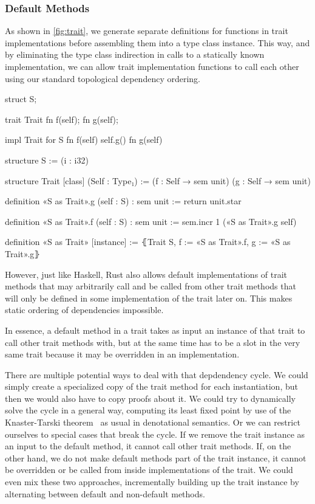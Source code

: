 \subsubsection{Default Methods}
\label{sec:default}

As shown in \autoref{fig:trait}, we generate separate definitions for functions in trait
implementations before assembling them into a type class instance. This way, and
by eliminating the type class indirection in calls to a statically known
implementation, we can allow trait implementation functions to call each other
using our standard topological dependency ordering.

\begin{sbs1}
struct S;

trait Trait {
  fn f(self);
  fn g(self);
}

impl Trait for S {
  fn f(self) {
    self.g()
  }
  fn g(self) {}
}
\end{sbs1}
\begin{sbs2}
structure S := (i : i32)

structure Trait [class] (Self : Type₁) :=
(f : Self → sem unit)
(g : Self → sem unit)

definition «S as Trait».g (self : S) : sem unit :=
return unit.star

definition «S as Trait».f (self : S) : sem unit :=
sem.incr 1 («S as Trait».g self)

definition «S as Trait» [instance] :=
⦃Trait S, f := «S as Trait».f, g := «S as Trait».g⦄
\end{sbs2}

However, just like Haskell, Rust also allows default implementations of trait
methods that may arbitrarily call and be called from other trait methods that
will only be defined in some implementation of the trait later on. This
makes static ordering of dependencies impossible.

In essence, a default method in a trait takes as input an instance of that trait
to call other trait methods with, but at the same time has to be a slot in the
very same trait because it may be overridden in an implementation.

There are multiple potential ways to deal with that depdendency cycle. We could
simply create a specialized copy of the trait method for each instantiation, but
then we would also have to copy proofs about it. We could try to dynamically solve the cycle in a general way, computing its least fixed point
by use of the Knaster-Tarski theorem~\cite{tarski1955lattice} as usual in
denotational semantics. Or we can restrict ourselves to special cases that break
the cycle. If we remove the trait instance as an input to the default method, it
cannot call other trait methods. If, on the other hand, we do not make default
methods part of the trait instance, it
cannot be overridden or be called from inside implementations of the trait. We
could even mix these two approaches, incrementally building up the
trait instance by alternating between default and non-default methods.

